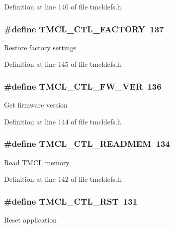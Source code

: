 Definition at line 140 of file tmcldefs.h.\hypertarget{group__CTLFuncs_gab41e9c01de441b30b228801e51243895}{
\subsubsection[{TMCL\_\-CTL\_\-FACTORY}]{\setlength{\rightskip}{0pt plus 5cm}\#define TMCL\_\-CTL\_\-FACTORY~137}}
\label{group__CTLFuncs_gab41e9c01de441b30b228801e51243895}
Restore factory settings 

Definition at line 145 of file tmcldefs.h.\hypertarget{group__CTLFuncs_gaac0228cc9a707b904b510de74a7fb505}{
\subsubsection[{TMCL\_\-CTL\_\-FW\_\-VER}]{\setlength{\rightskip}{0pt plus 5cm}\#define TMCL\_\-CTL\_\-FW\_\-VER~136}}
\label{group__CTLFuncs_gaac0228cc9a707b904b510de74a7fb505}
Get firmware version 

Definition at line 144 of file tmcldefs.h.\hypertarget{group__CTLFuncs_ga9d883e9bae5236c285877f884bb8a613}{
\subsubsection[{TMCL\_\-CTL\_\-READMEM}]{\setlength{\rightskip}{0pt plus 5cm}\#define TMCL\_\-CTL\_\-READMEM~134}}
\label{group__CTLFuncs_ga9d883e9bae5236c285877f884bb8a613}
Read TMCL memory 

Definition at line 142 of file tmcldefs.h.\hypertarget{group__CTLFuncs_ga433f27b92ba499465f7eab488fbd3cea}{
\subsubsection[{TMCL\_\-CTL\_\-RST}]{\setlength{\rightskip}{0pt plus 5cm}\#define TMCL\_\-CTL\_\-RST~131}}
\label{group__CTLFuncs_ga433f27b92ba499465f7eab488fbd3cea}
Reset application 

